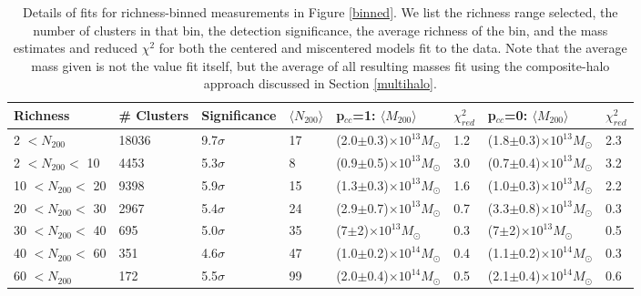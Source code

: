 \begin{landscape}

\begin{table}
  \centering
    \caption[Magnification Results for Richness-Binned Clusters]{Details of fits for richness-binned measurements in Figure \ref{binned}. We list the richness range selected, the number of clusters in that bin, the detection significance, the average richness of the bin, and the mass estimates and reduced $\chi^2$ for both the centered and miscentered models fit to the data. Note that the average mass given is not the value fit itself, but the average of all resulting masses fit using the composite-halo approach discussed in Section \ref{multihalo}.}
    \label{richtable}
    \begin{tabular}{llllllll}
      \hline
      Richness & \# Clusters & Significance & $\langle N_{200} \rangle$ & p$_{cc}$=1: $\langle M_{200} \rangle$ & $\chi^2_{red}$ & p$_{cc}$=0: $\langle M_{200} \rangle$ & $\chi^2_{red}$ \\ \hline
      2 $<N_{200}$ & 18036 & 9.7$\sigma$ & 17 & (2.0$\pm$0.3)$\times10^{13} M_{\odot}$ & 1.2 & (1.8$\pm$0.3)$\times10^{13} M_{\odot}$ & 2.3  \\
      2 $<N_{200}<$ 10 & 4453 & 5.3$\sigma$ & 8 & (0.9$\pm$0.5)$\times10^{13} M_{\odot}$ & 3.0 & (0.7$\pm$0.4)$\times10^{13} M_{\odot}$ & 3.2  \\
      10 $<N_{200}<$ 20 & 9398 & 5.9$\sigma$ & 15 & (1.3$\pm$0.3)$\times10^{13} M_{\odot}$ & 1.6 & (1.0$\pm$0.3)$\times10^{13} M_{\odot}$ & 2.2  \\
      20 $<N_{200}<$ 30 & 2967 & 5.4$\sigma$ & 24 & (2.9$\pm$0.7)$\times10^{13} M_{\odot}$ & 0.7 & (3.3$\pm$0.8)$\times10^{13} M_{\odot}$ & 0.3  \\
      30 $<N_{200}<$ 40 & 695 & 5.0$\sigma$ & 35 & (7$\pm$2)$\times10^{13} M_{\odot}$ & 0.3 & (7$\pm$2)$\times10^{13} M_{\odot}$ & 0.5  \\
      40 $<N_{200}<$ 60 & 351 & 4.6$\sigma$ & 47 & (1.0$\pm$0.2)$\times10^{14} M_{\odot}$ & 0.4 & (1.1$\pm$0.2)$\times10^{14} M_{\odot}$ & 0.3  \\
      60 $<N_{200}$ & 172 & 5.5$\sigma$ & 99 & (2.0$\pm$0.4)$\times10^{14} M_{\odot}$ & 0.5 & (2.1$\pm$0.4)$\times10^{14} M_{\odot}$ & 0.6  \\
      \hline
    \end{tabular}
\end{table}


\end{landscape}
